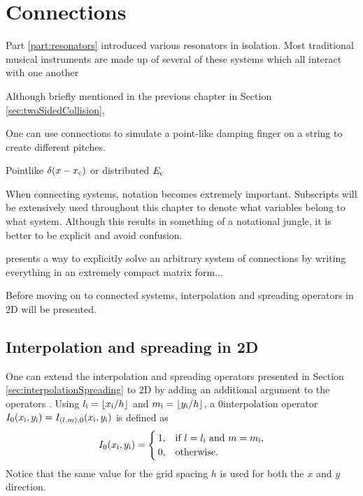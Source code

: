 \chapter{Connections}\label{ch:connections}
Part \ref{part:resonators} introduced various resonators in isolation. Most traditional musical instruments are made up of several of these systems which all interact with one another

Although briefly mentioned in the previous chapter in Section \ref{sec:twoSidedCollision}, 

One can use connections to simulate a point-like damping finger on a string to create different pitches.

Pointlike $\delta(x-x_{\text{c}})$ or distributed $E_{\text{c}}$

When connecting systems, notation becomes extremely important. Subscripts will be extensively used throughout this chapter to denote what variables belong to what system. Although this results in something of a notational jungle, it is better to be explicit and avoid confusion. 

\cite{Bilbao2009Modular} presents a way to explicitly solve an arbitrary system of connections by writing everything in an extremely compact matrix form... 

Before moving on to connected systems, interpolation and spreading operators in 2D will be presented.

\section{Interpolation and spreading in 2D}\label{sec:interpolationSpreading2D}
One can extend the interpolation and spreading operators presented in Section \ref{sec:interpolationSpreading} to 2D by adding an additional argument to the operators \cite{theBible}. Using $l_\itxt = \floor[x_\itxt / h]$ and $m_\itxt = \floor[y_\itxt / h]$, a $0$\thOrder interpolation operator $I_0(x_{\text{i}}, y_{\text{i}}) = I_{(l, m), 0}(x_{\text{i}}, y_{\text{i}})$ is defined as
\begin{equation}
    I_0(x_{\text{i}}, y_{\text{i}}) = \begin{cases}
        1, & \text{if } l = l_{\text{i}} \text{ and } m = m_{\text{i}},\\
        0, & \text{otherwise}.
    \end{cases}
\end{equation}
Notice that the same value for the grid spacing $h$ is used for both the $x$ and $y$ direction.

